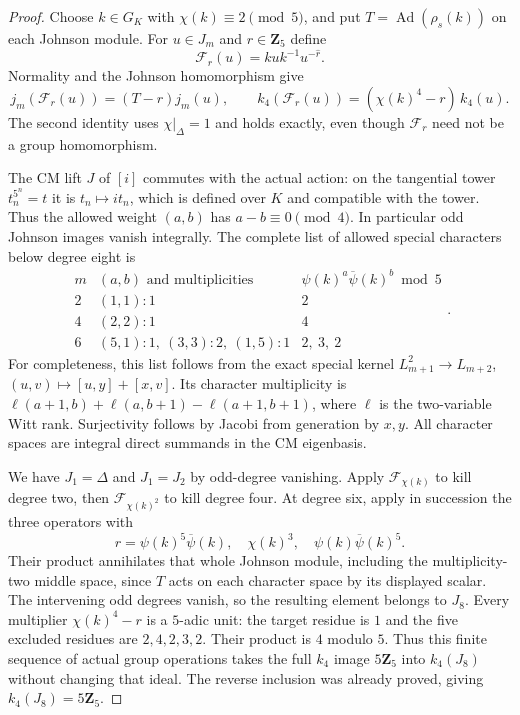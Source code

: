 \begin{proof}
Choose $k\in G_K$ with $\chi(k)\equiv2\pmod5$, and put
$T=\operatorname{Ad}(\rho_s(k))$ on each Johnson module.
For $u\in J_m$ and $r\in\mathbf Z_5$ define
\[
 \mathcal F_r(u)=kuk^{-1}u^{-\widehat r}.
\]
Normality and the Johnson homomorphism give
\[
 j_m(\mathcal F_r(u))=(T-r)j_m(u),\qquad
 k_4(\mathcal F_r(u))=(\chi(k)^4-r)\,k_4(u).
\]
The second identity uses $\chi|_\Delta=1$ and holds
exactly, even though $\mathcal F_r$ need not be a group
homomorphism.

The CM lift $J$ of $[i]$ commutes with the actual action:
on the tangential tower $t_n^{5^n}=t$ it is $t_n\mapsto i t_n$,
which is defined over $K$ and compatible with the tower.
Thus the allowed weight $(a,b)$ has $a-b\equiv0\pmod4$.
In particular odd Johnson images vanish integrally.
The complete list of allowed special characters below
degree eight is
\[
 \begin{array}{c|c|c}
  m& (a,b)\text{ and multiplicities}
        &\psi(k)^a\overline\psi(k)^b\bmod5\\ \hline
  2&(1,1):1&2\\
  4&(2,2):1&4\\
  6&(5,1):1,\ (3,3):2,\ (1,5):1&2,\ 3,\ 2
 \end{array}.
\]
For completeness, this list follows from the exact special
kernel
$L_{m+1}^2\to L_{m+2}$, $(u,v)\mapsto[u,y]+[x,v]$.
Its character multiplicity is
$\ell(a+1,b)+\ell(a,b+1)-\ell(a+1,b+1)$, where
$\ell$ is the two-variable Witt rank. Surjectivity follows
by Jacobi from generation by $x,y$. All character spaces
are integral direct summands in the CM eigenbasis.

We have $J_1=\Delta$ and $J_1=J_2$ by odd-degree vanishing.
Apply $\mathcal F_{\chi(k)}$ to kill degree two, then
$\mathcal F_{\chi(k)^2}$ to kill degree four.
At degree six, apply in succession the three operators
with
\[
 r=\psi(k)^5\overline\psi(k),\quad
   \chi(k)^3,\quad
   \psi(k)\overline\psi(k)^5.
\]
Their product annihilates that whole Johnson module, including
the multiplicity-two middle space, since $T$ acts on each
character space by its displayed scalar. The intervening
odd degrees vanish, so the resulting element belongs to
$J_8$. Every multiplier $\chi(k)^4-r$ is a $5$-adic unit:
the target residue is $1$ and the five excluded residues
are $2,4,2,3,2$. Their product is $4$ modulo $5$.
Thus this finite sequence of actual group operations takes
the full $k_4$ image $5\mathbf Z_5$ into $k_4(J_8)$
without changing that ideal. The reverse inclusion was
already proved, giving $k_4(J_8)=5\mathbf Z_5$.


\end{proof}
